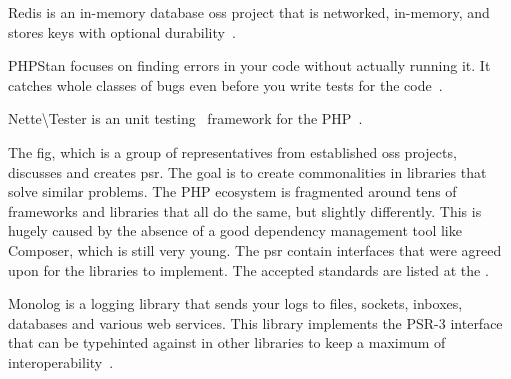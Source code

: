  \label{sec:theory:redis}

Redis is an in-memory database \gls{oss} project that is networked, in-memory, and stores keys with optional durability~\cite{wiki:redis}.

 \label{sec:theory:phpstan}

PHPStan focuses on finding errors in your code without actually running it. It catches whole classes of bugs even before you write tests for the code~\cite{github:phpstan}.

 \label{sec:theory:nette-tester}

Nette\textbackslash{}Tester is an unit testing~\cite{wiki:unit-testing} framework for the PHP~\cite{tester:docs}.

 \label{sec:theory:psr}

The \gls{fig}, which is a group of representatives from established \gls{oss} projects, discusses and creates \gls{psr}. The goal is to create commonalities in libraries that solve similar problems. The PHP ecosystem is fragmented around tens of frameworks and libraries that all do the same, but slightly differently. This is hugely caused by the absence of a good dependency management tool like Composer, which is still very young. The \gls{psr} contain interfaces that were agreed upon for the libraries to implement. The accepted standards are listed at the .~\cite{fig:psr}

 \label{sec:theory:monolog}

Monolog is a logging library that sends your logs to files, sockets, inboxes, databases and various web services. This library implements the PSR-3 interface that can be typehinted against in other libraries to keep a maximum of interoperability~\cite{monolog:readme}.
